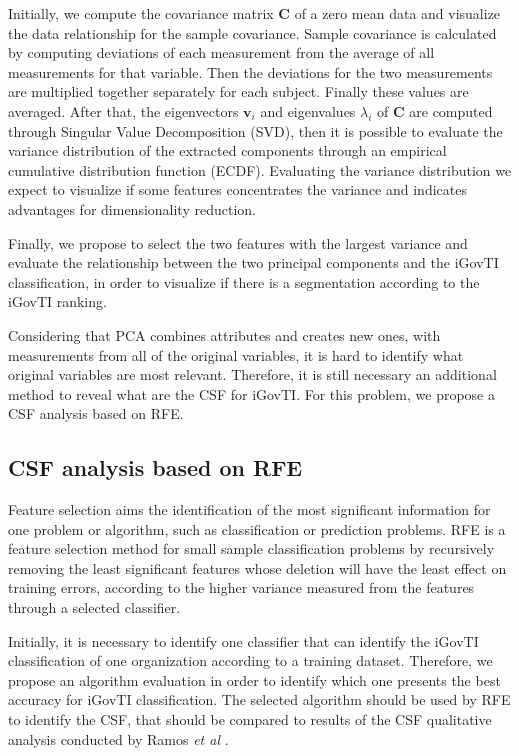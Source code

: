 Initially, we compute the covariance matrix $\mathbf{C}$ of a zero mean data and visualize the data relationship for the sample covariance. Sample covariance is calculated by computing deviations of each measurement from the average of all measurements for that variable. Then the deviations for the two measurements are multiplied together separately for each subject. Finally these values are averaged. After that, the eigenvectors $\mathbf{v}_i$ and eigenvalues $\lambda_i$ of $\mathbf{C}$ are computed through Singular Value Decomposition (SVD), then it is possible to evaluate the variance distribution of the extracted components through an empirical cumulative distribution function (ECDF). Evaluating the variance distribution we expect to visualize if some features concentrates the variance and indicates advantages for dimensionality reduction.

Finally, we propose to select the two features with the largest variance and evaluate the relationship between the two principal components and the iGovTI classification, in order to visualize if there is a segmentation according to the iGovTI ranking.

Considering that PCA combines attributes and creates new ones, with measurements from all of the original variables, it is hard to identify what original variables are most relevant. Therefore, it is still necessary an additional method to reveal what are the CSF for iGovTI. For this problem, we propose a CSF analysis based on RFE.

\subsection{CSF analysis based on RFE}
\label{sec:b_csfa}

Feature selection aims the identification of the most significant information for one problem or algorithm, such as classification or prediction problems. RFE is a feature selection method for small sample classification problems by recursively removing the least significant features whose deletion will have the least effect on training errors, according to the higher variance measured from the features through a selected classifier. 

Initially, it is necessary to identify one classifier that can identify the iGovTI classification of one organization according to a training dataset. Therefore, we propose an algorithm evaluation in order to identify which one presents the best accuracy for iGovTI classification. The selected algorithm should be used by RFE to identify the CSF, that should be compared to results of the CSF qualitative analysis conducted by Ramos \emph{et al} \cite{ramos2016information}.

